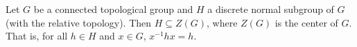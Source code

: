 Let $G$ be a connected topological group and $H$ a discrete normal subgroup of $G$ (with the relative topology). Then $H \subseteq Z(G)$, where $Z(G)$ is the center of $G$. That is, for all $h \in H$ and $x \in G$, $x^{-1} h x = h$.
